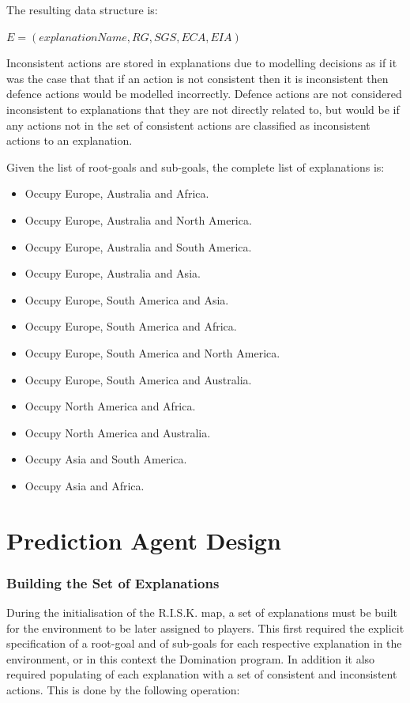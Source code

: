 \documentclass[parskip]{cs4rep}
\begin{document}
The resulting data structure is:\newline

\centerline{
$E = ( explanationName, RG, SGS, ECA, EIA )$
}

Inconsistent actions are stored in explanations due to modelling decisions as if it was the case that that if an action is not consistent then it is inconsistent then defence actions would be modelled incorrectly. Defence actions are not considered inconsistent to explanations that they are not directly related to, but would be if any actions not in the set of consistent actions are classified as inconsistent actions to an explanation.

Given the list of root-goals and sub-goals, the complete list of explanations is:

\begin{itemize}
\item
Occupy Europe, Australia and Africa.
\item
Occupy Europe, Australia and North America.
\item
Occupy Europe, Australia and South America.
\item
Occupy Europe, Australia and Asia.
\item
Occupy Europe, South America and Asia.
\item
Occupy Europe, South America and Africa.
\item
Occupy Europe, South America and North America.
\item
Occupy Europe, South America and Australia.
\item
Occupy North America and Africa.
\item
Occupy North America and Australia.
\item
Occupy Asia and South America.
\item
Occupy Asia and Africa.
\end{itemize}

\section{Prediction Agent Design}

\subsubsection{Building the Set of Explanations}

During the initialisation of the R.I.S.K. map, a set of explanations must be built for the environment to be later assigned to players. This first required the explicit specification of a root-goal and of sub-goals for each respective explanation in the environment, or in this context the Domination program. In addition it also required populating of each explanation with a set of consistent and inconsistent actions. This is done by the following operation:
\end{document}
